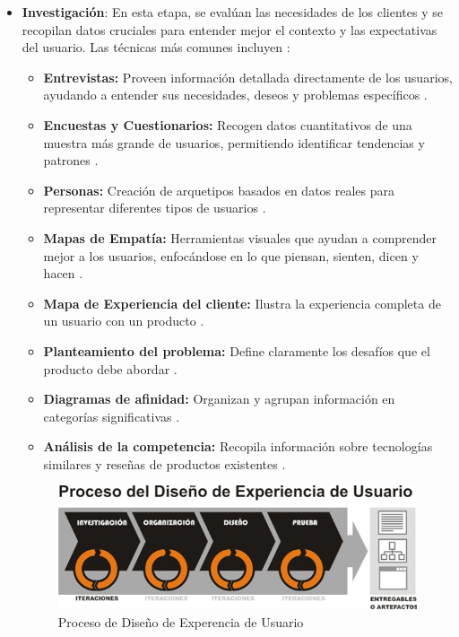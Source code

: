 \begin{itemize}
    \item \textbf{Investigación}: En esta etapa, se evalúan las necesidades de los clientes y se recopilan datos cruciales para entender mejor el contexto y las expectativas del usuario. Las técnicas más comunes incluyen \cite{Leon2013}:
    \begin{itemize}
        \item \textbf{Entrevistas:} Proveen información detallada directamente de los usuarios, ayudando a entender sus necesidades, deseos y problemas específicos \cite{Semi2022}.
        \item \textbf{Encuestas y Cuestionarios:} Recogen datos cuantitativos de una muestra más grande de usuarios, permitiendo identificar tendencias y patrones  \cite{Semi2022}.
        \item \textbf{Personas:} Creación de arquetipos basados en datos reales para representar diferentes tipos de usuarios  \cite{Semi2022}.
        \item \textbf{Mapas de Empatía:} Herramientas visuales que ayudan a comprender mejor a los usuarios, enfocándose en lo que piensan, sienten, dicen y hacen  \cite{Semi2022}.
        \item \textbf{Mapa de Experiencia del cliente:} Ilustra la experiencia completa de un usuario con un producto  \cite{Semi2022}.
        \item \textbf{Planteamiento del problema:} Define claramente los desafíos que el producto debe abordar  \cite{Semi2022}.
        \item \textbf{Diagramas de afinidad:} Organizan y agrupan información en categorías significativas  \cite{Semi2022}.
        \item \textbf{Análisis de la competencia:} Recopila información sobre tecnologías similares y reseñas de productos existentes  \cite{Semi2022}.
    \end{itemize}

\begin{figure}[h]
    \centering
    \includegraphics[width=0.5\linewidth]{figuras/proceso_diseno.png}
    \caption{Proceso de Diseño de Experencia de Usuario}
    \label{fig:enter-label}
\end{figure}


\end{itemize}
